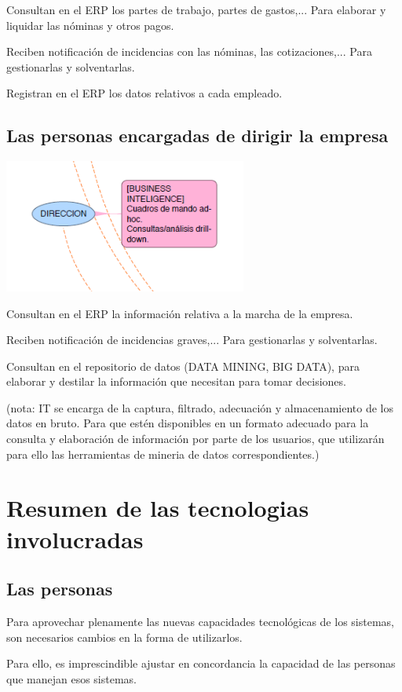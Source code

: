\documentclass[spanish,12pt,a4paper,final,oneside]{book}
\begin{document}
Consultan en el ERP los partes de trabajo, partes de gastos,... Para elaborar y liquidar las nóminas y otros pagos.

Reciben notificación de incidencias con las nóminas, las cotizaciones,... Para gestionarlas y solventarlas.

Registran en el ERP los datos relativos a cada empleado.

\subsection{Las personas encargadas de dirigir la empresa}
\includegraphics[width=0.6\textwidth]{subesquema - direccion01}

Consultan en el ERP la información relativa a la marcha de la empresa.

Reciben notificación de incidencias graves,... Para gestionarlas y solventarlas.

Consultan en el repositorio de datos (DATA MINING, BIG DATA), para elaborar y destilar la información que necesitan para tomar decisiones.

(nota: IT se encarga de la captura, filtrado, adecuación y almacenamiento de los datos en bruto. Para que estén disponibles en un formato adecuado para la consulta y elaboración de información por parte de los usuarios, que utilizarán para ello las herramientas de mineria de datos correspondientes.)



\newpage
\section{Resumen de las tecnologias involucradas}

\subsection{Las personas}
Para aprovechar plenamente las nuevas capacidades tecnológicas de los sistemas, son necesarios cambios en la forma de utilizarlos. 

Para ello, es imprescindible ajustar en concordancia la capacidad de las personas que manejan esos sistemas. 
\end{document}
